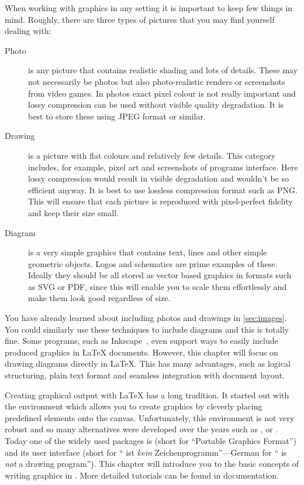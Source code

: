 When working with graphics in any setting it is important to keep few things
in mind. Roughly, there are three types of pictures that you may find yourself
dealing with:
\begin{description}
  \item[Photo] is any picture that contains realistic shading and lots of
    details. These may not necessarily be photos but also photo-realistic
    renders or screenshots from video games. In photos exact pixel colour is not
    really important and lossy compression can be used without visible quality
    degradation. It is best to store these using JPEG format or similar.
  \item[Drawing] is a picture with flat colours and relatively few details. This
    category includes, for example,  pixel art and screenshots of programs
    interface. Here lossy compression would result in visible degradation and
    wouldn't be so efficient anyway. It is best to use lossless compression
    format such as PNG\@. This will ensure that each picture is reproduced with
    pixel-perfect fidelity and keep their size small.
  \item[Diagram] is a very simple graphics that contains text, lines and other
    simple geometric objects. Logos and schematics are prime examples of these.
    Ideally they should be all stored as vector based graphics in formats such
    as SVG or PDF, since this will enable you to scale them effortlessly and
    make them look good regardless of size.
\end{description}

You have already learned about including photos and drawings in
\autoref{sec:images}. You could similarly use these techniques to include
diagrams and this is totally fine. Some programs, such as
Inkscape~\cite{inkscape}, even support ways to easily include produced graphics
in \LaTeX{} documents. However, this chapter will focus on drawing diagrams
directly in \LaTeX{}. This has many advantages, such as logical structuring,
plain text format and seamless integration with document layout.

Creating graphical output with \LaTeX{} has a long tradition. It started out
with the  environment which allows you to create graphics by
cleverly placing predefined elements onto the canvas. Unfortunately, this
environment is not very robust and so many alternatives were developed over the
years such as ,  or . Today one of
the widely used packages is  (short for \enquote{Portable Graphics
  Format}) and its user interface \TikZ{} (short for \enquote{\TikZ{} ist
  \textit{kein} Zeichenprogramm}---German for \enquote{\TikZ{} is \textit{not}
  a drawing program}). This chapter will introduce you to the basic concepts of
writing graphics in \TikZ{}. More detailed tutorials can be found in 
documentation.

